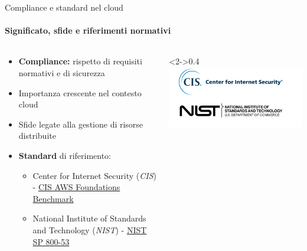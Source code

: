 \documentclass{beamer}
\newcommand{\hrefcol}[2]{\textcolor{cyan}{\href{#1}{#2}}}
\begin{document}
\begin{frame}{Compliance e standard nel cloud}
    \framesubtitle{Significato, sfide e riferimenti normativi}
    \begin{columns}
        \begin{column}{0.6\textwidth}
            \begin{itemize}
                \item<1-> \textbf{Compliance:} rispetto di requisiti normativi e di sicurezza
                \item Importanza crescente nel contesto cloud
                \item Sfide legate alla gestione di risorse distribuite
                \item<2-> \textbf{Standard} di riferimento:
                \begin{itemize}
                    \item Center for Internet Security (\emph{CIS}) - \hrefcol{https://www.cisecurity.org/}{CIS AWS Foundations Benchmark}
                    \item National Institute of Standards and Technology (\emph{NIST}) - \hrefcol{https://www.nist.gov/}{NIST SP 800-53}
                \end{itemize}
            \end{itemize}
        \end{column}
        \begin{column}<2->{0.4\textwidth}
            \includegraphics[width=\textwidth]{assets/cisnist.png}
        \end{column}
    \end{columns}
\end{frame}
\end{document}
